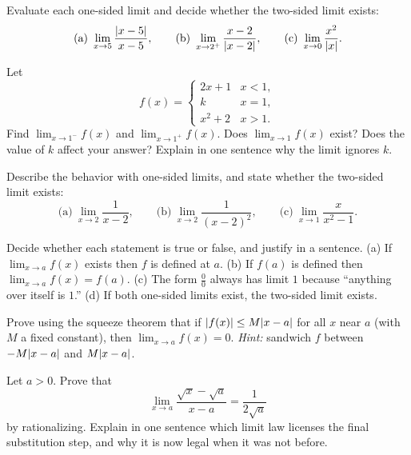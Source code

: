 \begin{exercise}
\label{ch07:exr-onesided}
Evaluate each one-sided limit and decide whether the two-sided limit exists:
\[
  \text{(a)}\ \lim_{x\to 5}\frac{\lvert x-5\rvert}{x-5},
  \qquad
  \text{(b)}\ \lim_{x\to 2^{+}}\frac{x-2}{\lvert x-2\rvert},
  \qquad
  \text{(c)}\ \lim_{x\to 0}\frac{x^{2}}{\lvert x\rvert}.
\]
\end{exercise}

\begin{exercise}[Piecewise]
\label{ch07:exr-piecewise}
Let
\[
  f(x) = \begin{cases} 2x+1 & x < 1,\\ k & x = 1,\\ x^{2}+2 & x > 1.\end{cases}
\]
Find $\lim_{x\to 1^{-}}f(x)$ and
$\lim_{x\to 1^{+}}f(x)$. Does $\lim_{x\to 1}f(x)$
exist? Does the value of $k$ affect your answer? Explain in one sentence why
the limit ignores $k$.
\end{exercise}

\begin{exercise}
\label{ch07:exr-blowup}
Describe the behavior with one-sided limits, and state whether the two-sided
limit exists:
\[
  \text{(a)}\ \lim_{x\to 2}\frac{1}{x-2},
  \qquad
  \text{(b)}\ \lim_{x\to 2}\frac{1}{(x-2)^{2}},
  \qquad
  \text{(c)}\ \lim_{x\to 1}\frac{x}{x^{2}-1}.
\]
\end{exercise}

\begin{exercise}[Conceptual]
\label{ch07:exr-concept}
Decide whether each statement is true or false, and justify in a sentence.
(a) If $\lim_{x\to a} f(x)$ exists then $f$ is defined at $a$.
(b) If $f(a)$ is defined then $\lim_{x\to a} f(x) = f(a)$.
(c) The form $\frac00$ always has limit $1$ because ``anything over itself is
$1$.''
(d) If both one-sided limits exist, the two-sided limit exists.
\end{exercise}

\begin{exercise}
\label{ch07:exr-proof1}
Prove using the squeeze theorem that if $\lvert f(x)\rvert \le M\lvert x-a\rvert$ for all $x$
near $a$ (with $M$ a fixed constant), then $\lim_{x\to a} f(x)=0$.
\emph{Hint:} sandwich $f$ between $-M\lvert x-a\rvert$ and $M\lvert x-a\rvert$.
\end{exercise}

\begin{exercise}
\label{ch07:exr-proof2}
Let $a>0$. Prove that
\[
  \lim_{x\to a}\frac{\sqrt{x}-\sqrt{a}}{x-a} = \frac{1}{2\sqrt{a}}
\]
by rationalizing. Explain in one sentence which limit law licenses the final
substitution step, and why it is now legal when it was not before.
\end{exercise}
